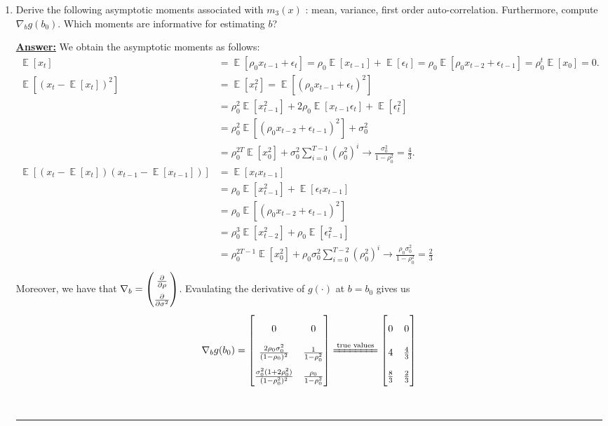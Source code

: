 \documentclass{article} %
\DeclareMathOperator*{\E}{\mathbb{E}} %
\theoremstyle{definition}
\newenvironment{solution}[1][Answer]{\begin{singlespace}\underline{\textbf{#1:}}\quad }{\ \rule{0.3em}{0.3em}\end{singlespace}} %
\begin{document}
	
	\begin{enumerate}
		\item Derive the following asymptotic moments associated with $ m_3(x) $ : mean, variance, first order auto-correlation. Furthermore, compute $ \nabla_b g(b_0) $. Which moments are informative for estimating $ b $?
		\begin{solution}
			We obtain the asymptotic moments as follows:
			\begin{align*}
				\E[x_t] & = \E[\rho_0 x_{t-1} + \epsilon_t] = \rho_0 \E[x_{t-1}] + \E[\epsilon_t] = \rho_0 \E[ \rho_0 x_{t-2} + \epsilon_{t-1} ] =  \rho_0^t \E[x_0] = 0.\\
				\E[(x_t - \E[x_t])^2] & = \E[x_t^2] = \E[(\rho_0 x_{t-1} + \epsilon_t)^2 ] \\ &= \rho_0^2 \E[x_{t-1}^2] + 2 \rho_0 \E[x_{t-1} \epsilon_t] + \E[\epsilon_t^2] \\ & = \rho_0^2 \E[ (\rho_0 x_{t-2} + \epsilon_{t-1})^2 ] + \sigma_0^2 \\ & = \rho_0^{2T} \E[x_0^2] + \sigma_0^2 \sum_{i=0}^{T-1} (\rho_0^2)^{i}  \rightarrow \frac{\sigma_0^2}{1 - \rho_0^2} = \frac{4}{3}.\\
				\E[(x_t - \E[x_t]) (x_{t-1} - \E[x_{t-1}]) ]&  =  \E[x_t x_{t-1}]  \\ &= \rho_0  \E[x_{t-1}^2]  + \E[ \epsilon_t x_{t-1} ] \\ & =   \rho_0 \E[ (\rho_0 x_{t-2} + \epsilon_{t-1})^2 ] \\ & =  \rho_0^3 \E[x_{t-2}^2] + \rho_0 \E[\epsilon_{t-1}^2]  \\ & = \rho_0^{2T - 1} \E[x_0^2] + \rho_0  \sigma_0^2 \sum_{i=0}^{T-2} (\rho_0^2)^{i}    \rightarrow  \frac{\rho_0 \sigma_0^2}{1 - \rho_0^2} = \frac{2}{3}   \\
			\end{align*}
			Moreover, we have that $ \nabla_b =
				\renewcommand\arraystretch{1.6}
			\begin{pmatrix}
				\frac{\partial}{\partial \rho} \\
				 \frac{\partial}{\partial \sigma^2}
			\end{pmatrix} $. Evaulating the derivative of $ g(\cdot) $ at $ b = b_0 $ gives us
			\begin{align*}
				\nabla_b g(b_0) = 
				\renewcommand\arraystretch{2}
				\begin{bmatrix}
					0 & 0 \\ \frac{2 \rho_0 \sigma_0^2}{(1 - \rho_0)^2} & \frac{1}{1 - \rho_0^2} \\  \frac{\sigma_0^2( 1 + 2 \rho_0^2)}{(1 - \rho_0^2)^2}  & \frac{\rho_0}{1 - \rho_0^2}
				\end{bmatrix}
				\xlongequal{\text{true values}}
				\begin{bmatrix}
					0 & 0 \\  4 & \frac{4}{3} \\  \frac{8}{3} & \frac{2}{3}
				\end{bmatrix}
			\end{align*}
		

\end{solution}
\end{enumerate}
\end{document}
